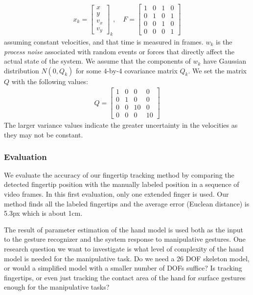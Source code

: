\begin{align*}
x_k = \begin{bmatrix}
	x   \\
	y   \\
	v_x \\
	v_y \end{bmatrix}_k, \quad
F = \begin{bmatrix}
	1 & 0 & 1 & 0 \\
	0 & 1 & 0 & 1 \\
	0 & 0 & 1 & 0 \\
	0 & 0 & 0 & 1 \end{bmatrix}
\end{align*}
assuming constant velocities, and that time is measured in frames.
$w_k$ is the \textit{process noise} associated with random events or forces
that directly affect the actual state of the system. We assume that the 
components of $w_k$ have Gaussian distribution $N(0, Q_k)$ for some $4$-by-$4$ 
covariance matrix $Q_k$. We set the matrix $Q$ with the following values:
\begin{align*}
Q = \begin{bmatrix}
	1 & 0 & 0 & 0 \\
	0 & 1 & 0 & 0 \\
	0 & 0 & 10 & 0 \\
	0 & 0 & 0 & 10 
	\end{bmatrix}
\end{align*}
The larger variance values indicate the greater uncertainty in the velocities as
they may not be constant.

\subsubsection{Evaluation}
We evaluate the accuracy of our fingertip tracking method by comparing the
detected fingertip position with the manually labeled position in a sequence of
video frames. In this first evaluation, only one extended finger is used. Our
method finds all the labeled fingertips and the average error (Euclean distance)
is 5.3px which is about 1cm.

The result of parameter estimation of the hand model is used both as the input
to the gesture recognizer and the system response to manipulative gestures. One
research question we want to investigate is what level of complexity of the
hand model is needed for the manipulative task. Do we need a 26 DOF skeleton
model, or would a simplified model with a smaller number of DOFs suffice?
Is tracking fingertips, or even just tracking the contact area of the hand for
surface gestures enough for the manipulative tasks?

